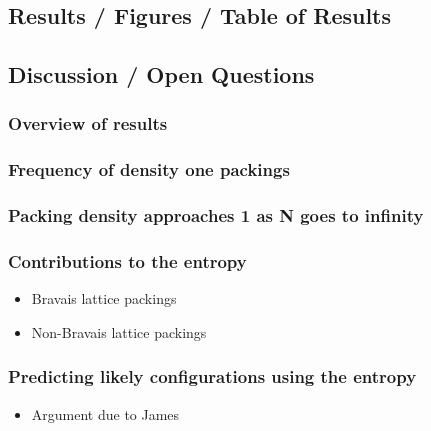 \documentclass[11pt]{article}
\begin{document}
\subsection{Results / Figures / Table of Results}
\label{sec-6.4}

\subsection{Discussion / Open Questions}
\label{sec-6.5}

\subsubsection{Overview of results}
\label{sec-6.5.1}

\subsubsection{Frequency of density one packings}
\label{sec-6.5.2}

\subsubsection{Packing density approaches 1 as N goes to infinity}
\label{sec-6.5.3}

\subsubsection{Contributions to the entropy}
\label{sec-6.5.4}

\begin{itemize}

\item Bravais lattice packings\\
\label{sec-6.5.4.1}


\item Non-Bravais lattice packings\\
\label{sec-6.5.4.2}

\end{itemize} %
\subsubsection{Predicting likely configurations using the entropy}
\label{sec-6.5.5}

\begin{itemize}

\item Argument due to James\\
\label{sec-6.5.5.1}

\end{itemize} %
\end{document}
